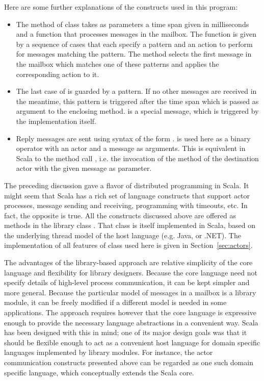 Here are some further explanations of the constructs used in this
program:
\begin{itemize}
\item
The  method of class  takes as
parameters a time span given in milliseconds and a function that
processes messages in the mailbox. The function is given by a sequence
of cases that each specify a pattern and an action to perform for
messages matching the pattern. The  method selects
the first message in the mailbox which matches one of these patterns
and applies the corresponding action to it.
\item
The last case of  is guarded by a
 pattern. If no other messages are received in the meantime, this
pattern is triggered after the time span which is passed as argument
to the enclosing  method.  is a
special message, which is triggered by the  implementation itself.
\item
Reply messages are sent using syntax of the form
. \code{!} is used here as a
binary operator with an actor and a message as arguments. This is
equivalent in Scala to the method call
, i.e. the invocation of
the \code{!} method of the destination actor with the given message as
parameter.
\end{itemize}
The preceding discussion gave a flavor of distributed programming in
Scala. It might seem that Scala has a rich set of language constructs
that support actor processes, message sending and receiving,
programming with timeouts, etc. In fact, the opposite is true. All the
constructs discussed above are offered as methods in the library class
. That class is itself implemented in Scala, based on the underlying 
thread model of the host language (e.g. Java, or .NET).
The implementation of all features of class  used here is
given in Section~\ref{sec:actors}.

The advantages of the library-based approach are relative simplicity
of the core language and flexibility for library designers. Because
the core language need not specify details of high-level process
communication, it can be kept simpler and more general. Because the
particular model of messages in a mailbox is a library module, it can
be freely modified if a different model is needed in some
applications.  The approach requires however that the core language is
expressive enough to provide the necessary language abstractions in a
convenient way. Scala has been designed with this in mind; one of its
major design goals was that it should be flexible enough to act as a
convenient host language for domain specific languages implemented by
library modules. For instance, the actor communication constructs
presented above can be regarded as one such domain specific language,
which conceptually extends the Scala core.

